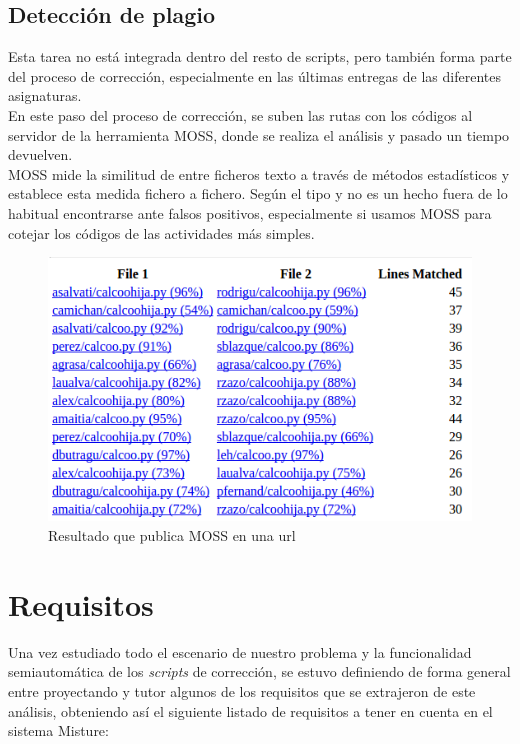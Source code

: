\subsection{Detección de plagio}
\label{sec:detec_plagio}


Esta tarea no está integrada dentro del resto de scripts, pero también forma parte del proceso de corrección, especialmente en las últimas entregas de las diferentes asignaturas.\\


En este paso del proceso de corrección, se suben las rutas con los códigos al servidor de la herramienta MOSS, donde se realiza el análisis y pasado un tiempo devuelven.\\


MOSS mide la similitud de entre ficheros texto a través de métodos estadísticos y establece esta medida fichero a fichero. Según el tipo y no es un hecho fuera de lo habitual encontrarse ante falsos positivos, especialmente si usamos MOSS para cotejar los códigos de las actividades más simples.\\

\begin{figure}[H]
   \centering
   \includegraphics[width=16cm]{img/Selection_021_moss}
   \caption{Resultado que publica MOSS en una url}
   \label{figura:res_moss}
\end{figure}

\section{Requisitos}
\label{sec:requisitos}


Una vez estudiado todo el escenario de nuestro problema y la funcionalidad semiautomática de los \textit{scripts} de corrección, se estuvo definiendo de forma general entre proyectando y tutor algunos de los requisitos que se extrajeron de este análisis, obteniendo así el siguiente listado de requisitos a tener en cuenta en el sistema Misture:

